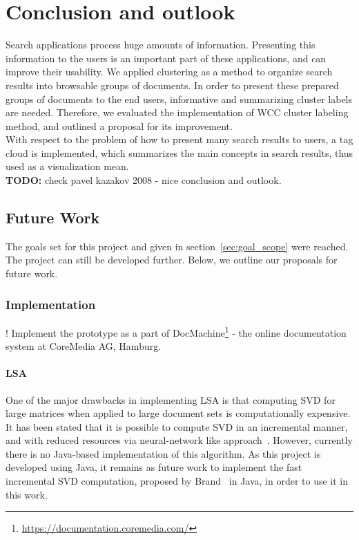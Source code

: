 \chapter{Conclusion and outlook}
\label{sec:conclusion}

Search applications process huge amounts of information. Presenting this information to the users is an important part of these applications, and can improve their usability. We applied clustering as a method to organize search results into browsable groups of documents. In order to present these prepared groups of documents to the end users, informative and summarizing cluster labels are needed. Therefore, we evaluated the implementation of \gls{WCC} cluster labeling method, and outlined a proposal for its improvement. \\

With respect to the problem of how to present many search results to users, a tag cloud is implemented, which summarizes the main concepts in search results, thus used as a visualization mean. \\

\textbf{TODO:} check pavel kazakov 2008 - nice conclusion and outlook. \\

\section{Future Work}
The goals set for this project and given in section~\ref{sec:goal_scope} were reached. The project can still be developed further. Below, we outline our proposals for future work. \\

\subsection{Implementation}

! Implement the prototype as a part of DocMachine\footnote{\url{https://documentation.coremedia.com/}} - the online documentation system at CoreMedia AG, Hamburg.

\subsubsection{LSA}
One of the major drawbacks in implementing \gls{LSA} is that computing \gls{SVD} for large matrices when applied to large document sets is computationally expensive. It has been stated that it is possible to compute \gls{SVD} in an incremental manner, and with reduced resources via neural-network like approach~\cite{brand06}. However, currently there is no Java-based implementation of this algorithm. As this project is developed using Java, it remains as future work to implement the fast incremental \gls{SVD} computation, proposed by Brand~\cite{brand06} in Java, in order to use it in this work. \\

